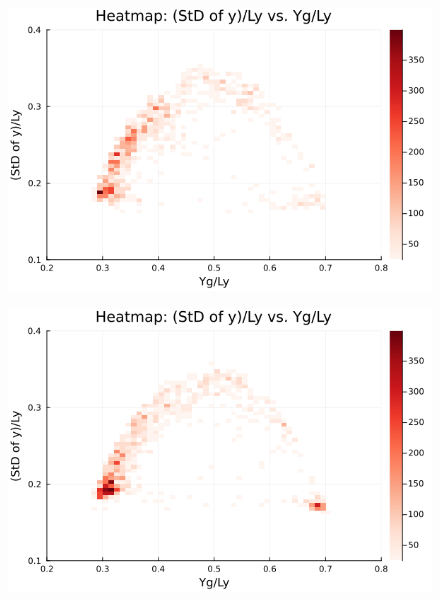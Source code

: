 \begin{figure}[H]
  \centering
  \includegraphics[scale=0.6]{image/RaRtmap_heat/2023-11-15T05:03:45.973__chi1.265_Ay50_rho0.4_T0.43_dT0.04_Rd0.0_Rt0.25_Ra0.938769_g0.0003999718779659611_run4.0e7_output.png}
  \label{}
\end{figure}

\begin{figure}[H]
  \centering
  \includegraphics[scale=0.6]{image/RaRtmap_heat/2023-11-15T05:53:00.667__chi1.265_Ay50_rho0.4_T0.43_dT0.04_Rd0.0_Rt0.25_Ra1.4081535_g0.0003999718779659611_run4.0e7_output.png}
  \label{}
\end{figure}

